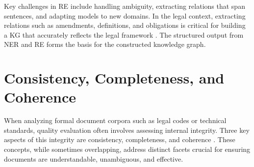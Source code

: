 Key challenges in RE include handling ambiguity, extracting relations that span sentences, and adapting models to new domains. In the legal context, extracting relations such as amendments, definitions, and obligations is critical for building a KG that accurately reflects the legal framework \parencite{RefWorks:RefID:77-tauqeer2022automated, RefWorks:RefID:76-dhani2021similar}. The structured output from NER and RE forms the basis for the constructed knowledge graph.

\section{Consistency, Completeness, and Coherence}
When analyzing formal document corpora such as legal codes or technical standards, quality evaluation often involves assessing internal integrity. Three key aspects of this integrity are consistency, completeness, and coherence \parencite{RefWorks:RefID:29-umar2024advances}. These concepts, while sometimes overlapping, address distinct facets crucial for ensuring documents are understandable, unambiguous, and effective.

